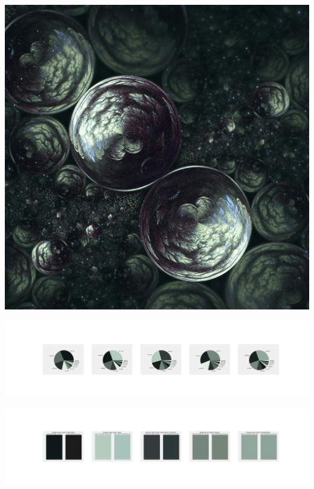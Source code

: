 \documentclass[11pt]{article}
\begin{document}
\begin{landscape}
    \begin{center}
    \includegraphics[width=\textwidth]{./nbimg/file (404).jpg}
    \end{center}

    \begin{center}
    \includegraphics[width=250mm]{./nbimg/pie-339.jpg}
    \end{center}

    \begin{center}
    \includegraphics[width=250mm]{./nbimg/peak-339.jpg}
    \end{center}
    


\end{landscape}
\end{document}
